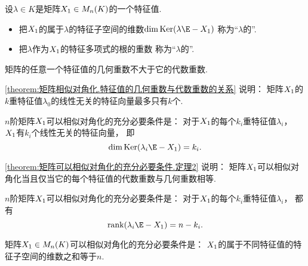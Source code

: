 \begin{definition}
设\(\lambda \in K\)是矩阵\(X_1 \in M_n(K)\)的一个特征值.
\begin{itemize}
	\item 把\(X_1\)的属于\(\lambda\)的特征子空间的维数\(\dim\Ker(\lambda\E-\A)\)
	称为“\(\lambda\)的”.
	\item 把\(\lambda\)作为\(X_1\)的特征多项式的根的重数
	称为“\(\lambda\)的”.
\end{itemize}
\end{definition}
\begin{theorem}\label{theorem:矩阵相似对角化.特征值的几何重数与代数重数的关系}
矩阵的任意一个特征值的几何重数不大于它的代数重数.
\end{theorem}
\begin{remark}
\cref{theorem:矩阵相似对角化.特征值的几何重数与代数重数的关系} 说明：
矩阵\(X_1\)的\(k\)重特征值\(\lambda_0\)的线性无关的特征向量最多只有\(k\)个.
\end{remark}

\begin{theorem}\label{theorem:矩阵可以相似对角化的充分必要条件.定理2}
\(n\)阶矩阵\(X_1\)可以相似对角化的充分必要条件是：
对于\(X_1\)的每个\(k_i\)重特征值\(\lambda_i\)，
\(X_1\)有\(k_i\)个线性无关的特征向量，
即\[
	\dim\Ker(\lambda_i\E-\A) = k_i.
\]
\end{theorem}
\begin{remark}
\cref{theorem:矩阵可以相似对角化的充分必要条件.定理2} 说明：
矩阵\(X_1\)可以相似对角化当且仅当它的每个特征值的代数重数与几何重数相等.
\end{remark}

\begin{corollary}\label{theorem:矩阵可以相似对角化的充分必要条件.定理3}
\(n\)阶矩阵\(X_1\)可以相似对角化的充分必要条件是：
对于\(X_1\)的每个\(k_i\)重特征值\(\lambda_i\)，
都有\[
	\rank(\lambda_i\E-\A) = n-k_i.
\]
\end{corollary}

\begin{theorem}\label{theorem:矩阵可以相似对角化的充分必要条件.定理4}
矩阵\(X_1 \in M_n(K)\)可以相似对角化的充分必要条件是：
\(X_1\)的属于不同特征值的特征子空间的维数之和等于\(n\).
\end{theorem}

